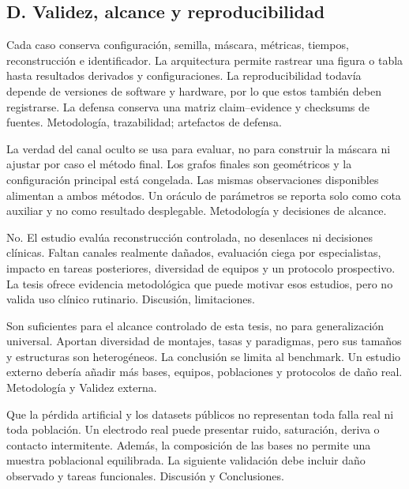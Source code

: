 \subsection*{D. Validez, alcance y reproducibilidad}

{Cada caso conserva configuración, semilla, máscara, métricas, tiempos, reconstrucción e identificador.}
{La arquitectura permite rastrear una figura o tabla hasta resultados derivados y configuraciones. La reproducibilidad todavía depende de versiones de software y hardware, por lo que estos también deben registrarse. La defensa conserva una matriz claim--evidence y checksums de fuentes.}
{Metodología, trazabilidad; artefactos de defensa.}

{La verdad del canal oculto se usa para evaluar, no para construir la máscara ni ajustar por caso el método final.}
{Los grafos finales son geométricos y la configuración principal está congelada. Las mismas observaciones disponibles alimentan a ambos métodos. Un oráculo de parámetros se reporta solo como cota auxiliar y no como resultado desplegable.}
{Metodología y decisiones de alcance.}

{No. El estudio evalúa reconstrucción controlada, no desenlaces ni decisiones clínicas.}
{Faltan canales realmente dañados, evaluación ciega por especialistas, impacto en tareas posteriores, diversidad de equipos y un protocolo prospectivo. La tesis ofrece evidencia metodológica que puede motivar esos estudios, pero no valida uso clínico rutinario.}
{Discusión, limitaciones.}

{Son suficientes para el alcance controlado de esta tesis, no para generalización universal.}
{Aportan diversidad de montajes, tasas y paradigmas, pero sus tamaños y estructuras son heterogéneos. La conclusión se limita al benchmark. Un estudio externo debería añadir más bases, equipos, poblaciones y protocolos de daño real.}
{Metodología y Validez externa.}

{Que la pérdida artificial y los datasets públicos no representan toda falla real ni toda población.}
{Un electrodo real puede presentar ruido, saturación, deriva o contacto intermitente. Además, la composición de las bases no permite una muestra poblacional equilibrada. La siguiente validación debe incluir daño observado y tareas funcionales.}
{Discusión y Conclusiones.}

